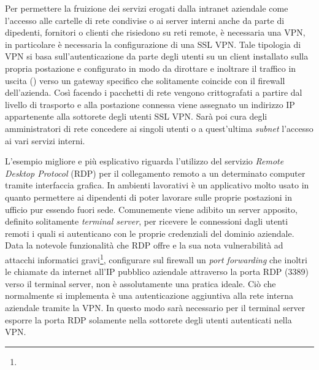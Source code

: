 \documentclass[target=bach,aauheader=]{thud}
\begin{document}
Per permettere la fruizione dei servizi erogati dalla intranet aziendale come l'accesso alle cartelle di rete condivise o ai server interni anche da parte di dipedenti, fornitori o clienti che risiedono su reti remote, è necessaria una VPN, in particolare è necessaria la configurazione di una SSL VPN. Tale tipologia di VPN si basa sull'autenticazione da parte degli utenti su un client installato sulla propria postazione e configurato in modo da dirottare e inoltrare il traffico in uscita () verso un gateway specifico che solitamente coincide con il firewall dell'azienda. Così facendo i pacchetti di rete vengono crittografati a partire dal livello di trasporto e alla postazione connessa viene assegnato un indirizzo IP appartenente alla sottorete degli utenti SSL VPN. Sarà poi cura degli amministratori di rete concedere ai singoli utenti o a quest'ultima \textit{subnet} l'accesso ai vari servizi interni. 

L'esempio migliore e più esplicativo riguarda l'utilizzo del servizio \textit{Remote Desktop Protocol} (RDP) per il collegamento remoto a un determinato computer tramite interfaccia grafica. In ambienti lavorativi è un applicativo molto usato in quanto permettere ai dipendenti di poter lavorare sulle proprie postazioni in ufficio pur essendo fuori sede. Comunemente viene adibito un server apposito, definito solitamente \textit{terminal server}, per ricevere le connessioni dagli utenti remoti i quali si autenticano con le proprie credenziali del dominio aziendale. Data la notevole funzionalità che RDP offre e la sua nota vulnerabilità ad attacchi informatici gravi\footnote{}, configurare sul firewall un \textit{port forwarding} che inoltri le chiamate da internet all'IP pubblico aziendale attraverso la porta RDP (3389) verso il terminal server, non è assolutamente una pratica ideale. Ciò che normalmente si implementa è una autenticazione aggiuntiva alla rete interna aziendale tramite la VPN. In questo modo sarà necessario per il terminal server esporre la porta RDP solamente nella sottorete degli utenti autenticati nella VPN.
\end{document}
